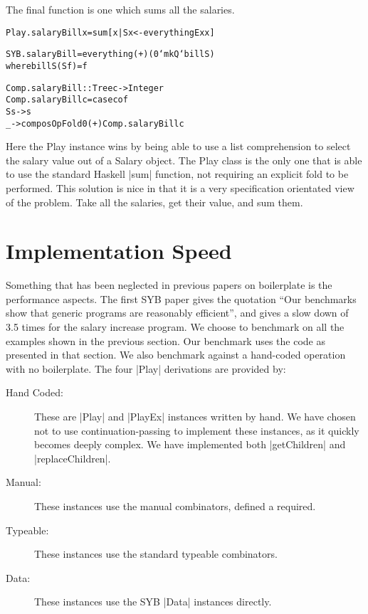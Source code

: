 \documentclass[preprint]{sigplanconf}
\newenvironment{code}{\begin{alltt}\small}{\end{alltt}}
\begin{document}
The final function is one which sums all the salaries.

\begin{code}
Play.salaryBill x = sum [x | S x <- everythingEx x]

SYB.salaryBill = everything (+) (0 `mkQ` billS)
   where billS (S f) = f

Comp.salaryBill :: Tree c -> Integer
Comp.salaryBill c = case c of
    S s -> s
    _ -> composOpFold 0 (+) Comp.salaryBill c
\end{code}

Here the Play instance wins by being able to use a list comprehension to select the salary value out of a Salary object. The Play class is the only one that is able to use the standard Haskell |sum| function, not requiring an explicit fold to be performed. This solution is nice in that it is a very specification orientated view of the problem. Take all the salaries, get their value, and sum them.


\section{Implementation Speed}

Something that has been neglected in previous papers on boilerplate is the performance aspects. The first SYB paper gives the quotation ``Our benchmarks show that generic programs are reasonably efficient'', and gives a slow down of 3.5 times for the salary increase program. We choose to benchmark on all the examples shown in the previous section. Our benchmark uses the code as presented in that section. We also benchmark against a hand-coded operation with no boilerplate. The four |Play| derivations are provided by:

\begin{description}
\item[Hand Coded:] These are |Play| and |PlayEx| instances written by hand. We have chosen not to use continuation-passing to implement these instances, as it quickly becomes deeply complex. We have implemented both |getChildren| and |replaceChildren|.
\item[Manual:] These instances use the manual combinators, defined a required.
\item[Typeable:] These instances use the standard typeable combinators.
\item[Data:] These instances use the SYB |Data| instances directly.
\end{description}
\end{document}
